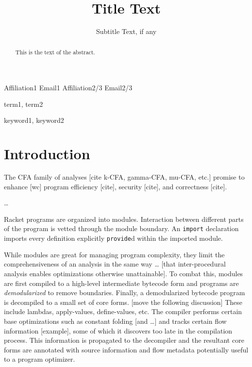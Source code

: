 \documentclass[preprint]{sigplanconf}
\begin{document}
\copyrightdata{[to be supplied]} 


\title{Title Text}
\subtitle{Subtitle Text, if any}

           {Affiliation1}
           {Email1}
           {Affiliation2/3}
           {Email2/3}

\maketitle

\begin{abstract}
This is the text of the abstract.
\end{abstract}


\terms
term1, term2

\keywords
keyword1, keyword2

\section{Introduction}

The CFA family of analyses [cite k-CFA, gamma-CFA, mu-CFA, etc.] promise to enhance [wc] program efficiency [cite], security [cite], and correctness [cite].

…

Racket programs are organized into modules.
Interaction between different parts of the program is vetted through the module boundary.
An \texttt{import} declaration imports every definition explicitly \texttt{provide}d within the imported module.

While modules are great for managing program complexity, they limit the comprehensiveness of an analysis in the same way … [that inter-procedural analysis enables optimizations otherwise unattainable].
To combat this, modules are first compiled to a high-level intermediate bytecode form and programs are \textit{demodularized} to remove boundaries.
Finally, a demodularized bytecode program is decompiled to a small set of core forms.
[move the following discussion]
These include lambdas, apply-values, define-values, etc.
The compiler performs certain base optimizations such as constant folding [and …] and tracks certain flow information [example], some of which it discovers too late in the compilation process.
This information is propagated to the decompiler and the resultant core forms are annotated with source information and flow metadata potentially useful to a program optimizer.
\end{document}
